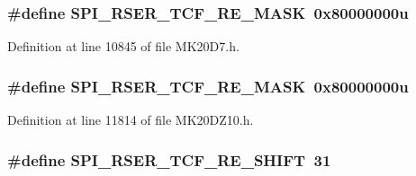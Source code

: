 \subsubsection[{\texorpdfstring{S\+P\+I\+\_\+\+R\+S\+E\+R\+\_\+\+T\+C\+F\+\_\+\+R\+E\+\_\+\+M\+A\+SK}{SPI_RSER_TCF_RE_MASK}}]{\setlength{\rightskip}{0pt plus 5cm}\#define S\+P\+I\+\_\+\+R\+S\+E\+R\+\_\+\+T\+C\+F\+\_\+\+R\+E\+\_\+\+M\+A\+SK~0x80000000u}\hypertarget{group___s_p_i___register___masks_ga51ba97f1d47ebd36d19c5a634ce96873}{}\label{group___s_p_i___register___masks_ga51ba97f1d47ebd36d19c5a634ce96873}


Definition at line 10845 of file M\+K20\+D7.\+h.

\subsubsection[{\texorpdfstring{S\+P\+I\+\_\+\+R\+S\+E\+R\+\_\+\+T\+C\+F\+\_\+\+R\+E\+\_\+\+M\+A\+SK}{SPI_RSER_TCF_RE_MASK}}]{\setlength{\rightskip}{0pt plus 5cm}\#define S\+P\+I\+\_\+\+R\+S\+E\+R\+\_\+\+T\+C\+F\+\_\+\+R\+E\+\_\+\+M\+A\+SK~0x80000000u}\hypertarget{group___s_p_i___register___masks_ga51ba97f1d47ebd36d19c5a634ce96873}{}\label{group___s_p_i___register___masks_ga51ba97f1d47ebd36d19c5a634ce96873}


Definition at line 11814 of file M\+K20\+D\+Z10.\+h.

\subsubsection[{\texorpdfstring{S\+P\+I\+\_\+\+R\+S\+E\+R\+\_\+\+T\+C\+F\+\_\+\+R\+E\+\_\+\+S\+H\+I\+FT}{SPI_RSER_TCF_RE_SHIFT}}]{\setlength{\rightskip}{0pt plus 5cm}\#define S\+P\+I\+\_\+\+R\+S\+E\+R\+\_\+\+T\+C\+F\+\_\+\+R\+E\+\_\+\+S\+H\+I\+FT~31}\hypertarget{group___s_p_i___register___masks_ga51740ce9a6d3a38cf50cb1f19af3d002}{}\label{group___s_p_i___register___masks_ga51740ce9a6d3a38cf50cb1f19af3d002}


